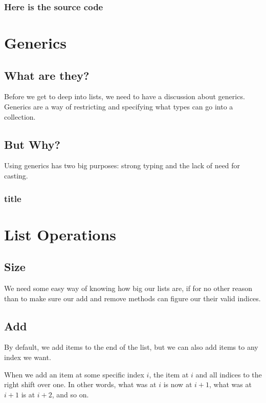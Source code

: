 \subsubsection*{Here is the source code}



\section{Generics}

\subsection{What are they?}


Before we get to deep into lists, we need to have a discussion about generics. Generics are a way of restricting and specifying what types can go into a collection.

\subsection{But Why?}


Using generics has two big purposes: strong typing and the lack of need for casting.


\subsubsection{title}


\section{List Operations}


\subsection{Size} We need some easy way of knowing how big our lists are, if for no other reason than to make sure our  add and remove methods can figure our their valid indices.


\subsection{Add}  By default, we add items to the end of the list, but we can also add items to any index we want.

When we add an item at some specific index $ i $, the item at $ i $ and all indices to the right shift over one.  In other words, what was at $ i $ is now at $ i+1 $, what was at $ i+1 $ is at $ i+2 $,  and so on.

